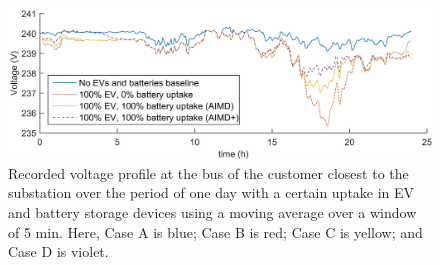 \begin{figure}[htb]\centering
	\includegraphics{_chapter1/fig/input/voltage-profiles-excerpt}
	\caption{Recorded voltage profile at the bus of the customer closest to the substation over the period of one day with a certain uptake in EV and battery storage devices using a moving average over a window of 5 min. Here, Case {A} is blue; Case {B} is red; Case {C} is yellow; and Case {D} is violet.}
 \label{ch1:fig:voltage-profiles-excerpt}
\end{figure}
